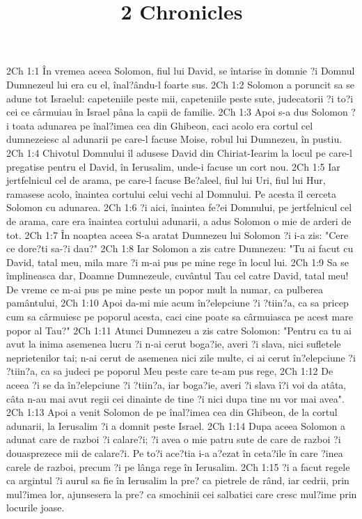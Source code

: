 

\title{2 Chronicles}

2Ch 1:1  În vremea aceea Solomon, fiul lui David, se întarise în domnie ?i Domnul Dumnezeul lui era cu el, înal?ându-l foarte sus.
2Ch 1:2  Solomon a poruncit sa se adune tot Israelul: capeteniile peste mii, capeteniile peste sute, judecatorii ?i to?i cei ce cârmuiau în Israel pâna la capii de familie.
2Ch 1:3  Apoi s-a dus Solomon ?i toata adunarea pe înal?imea cea din Ghibeon, caci acolo era cortul cel dumnezeiesc al adunarii pe care-l facuse Moise, robul lui Dumnezeu, în pustiu.
2Ch 1:4  Chivotul Domnului îl adusese David din Chiriat-Iearim la locul pe care-l pregatise pentru el David, în Ierusalim, unde-i facuse un cort nou.
2Ch 1:5  Iar jertfelnicul cel de arama, pe care-l facuse Be?aleel, fiul lui Uri, fiul lui Hur, ramasese acolo, înaintea cortului celui vechi al Domnului. Pe acesta îl cerceta Solomon cu adunarea.
2Ch 1:6  ?i aici, înaintea fe?ei Domnului, pe jertfelnicul cel de arama, care era înaintea cortului adunarii, a adus Solomon o mie de arderi de tot.
2Ch 1:7  În noaptea aceea S-a aratat Dumnezeu lui Solomon ?i i-a zis: "Cere ce dore?ti sa-?i dau?"
2Ch 1:8  Iar Solomon a zis catre Dumnezeu: "Tu ai facut cu David, tatal meu, mila mare ?i m-ai pus pe mine rege în locul lui.
2Ch 1:9  Sa se împlineasca dar, Doamne Dumnezeule, cuvântul Tau cel catre David, tatal meu! De vreme ce m-ai pus pe mine peste un popor mult la numar, ca pulberea pamântului,
2Ch 1:10  Apoi da-mi mie acum în?elepciune ?i ?tiin?a, ca sa pricep cum sa cârmuiesc pe poporul acesta, caci cine poate sa cârmuiasca pe acest mare popor al Tau?"
2Ch 1:11  Atunci Dumnezeu a zis catre Solomon: "Pentru ca tu ai avut la inima asemenea lucru ?i n-ai cerut boga?ie, averi ?i slava, nici sufletele neprietenilor tai; n-ai cerut de asemenea nici zile multe, ci ai cerut în?elepciune ?i ?tiin?a, ca sa judeci pe poporul Meu peste care te-am pus rege,
2Ch 1:12  De aceea ?i se da în?elepciune ?i ?tiin?a, iar boga?ie, averi ?i slava î?i voi da atâta, câta n-au mai avut regii cei dinainte de tine ?i nici dupa tine nu vor mai avea".
2Ch 1:13  Apoi a venit Solomon de pe înal?imea cea din Ghibeon, de la cortul adunarii, la Ierusalim ?i a domnit peste Israel.
2Ch 1:14  Dupa aceea Solomon a adunat care de razboi ?i calare?i; ?i avea o mie patru sute de care de razboi ?i douasprezece mii de calare?i. Pe to?i ace?tia i-a a?ezat în ceta?ile în care ?inea carele de razboi, precum ?i pe lânga rege în Ierusalim.
2Ch 1:15  ?i a facut regele ca argintul ?i aurul sa fie în Ierusalim la pre? ca pietrele de rând, iar cedrii, prin mul?imea lor, ajunsesera la pre? ca smochinii cei salbatici care cresc mul?ime prin locurile joase.
